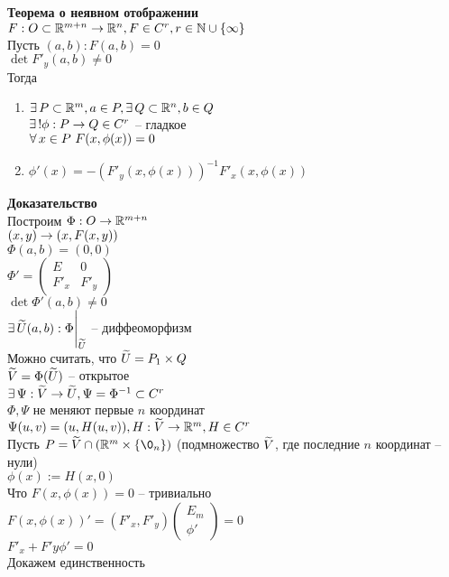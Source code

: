 \documentclass[12pt]{article}
\begin{document}
\textbf{Теорема о неявном отображении}\\
$F: O \subset \mathbb{R}^{m+n} \rightarrow \mathbb{R}^n, F \in C^r, r \in \mathbb{N} \cup \{\infty\}$\\
Пусть $(a, b): F(a,b) = 0$\\
$\det F'_y(a,b)\neq 0$\\
Тогда 
\begin{enumerate}
    \item $\exists\, P \subset \mathbb{R}^m, a \in P, \exists\, Q \subset \mathbb{R}^n, b \in Q$\\
    $\exists\,! \phi: P \rightarrow Q \in C^r$ -- гладкое\\
    $\forall\, x \in P\ F(x, \phi(x)) = 0$
    \item $\phi'(x) = -(F'_y(x,\phi(x)))^{-1}F'_x(x,\phi(x))$
\end{enumerate}
\textbf{Доказательство}\\
Построим $\Phi: O \rightarrow \mathbb{R}^{m+n}$\\
$(x,y) \rightarrow (x, F(x, y))$\\
$\Phi(a,b) = (0,0)$\\
$\Phi' = \begin{pmatrix}
    E & 0\\
    F'_x & F'_y
\end{pmatrix}$\\
$\det \Phi'(a,b) \neq 0$\\
$\exists\, \widetilde U(a,b): \Phi\Biggr|_{\widetilde U}$ -- диффеоморфизм\\
Можно считать, что $\widetilde U = P_1 \times Q$\\
$\widetilde V = \Phi(\widetilde U)$ -- открытое\\
$\exists\, \Psi: \widetilde V \rightarrow \widetilde U, \Psi = \Phi^{-1}\subset C^r$\\
$\Phi, \Psi$ не меняют первые $n$ координат\\
$\Psi(u,v) = (u, H(u,v)), H: \widetilde V \rightarrow \mathbb{R}^m, H \in C^r$\\
Пусть $P = \ot V \cap (\Rset^m \times \{\0_n\})$ (подмножество $\widetilde V$, где последние $n$ координат -- нули)\\
$\phi(x):= H(x,0)$\\
Что $F(x, \phi(x)) = 0$ -- тривиально\\
$F(x, \phi(x))' = (F'_x, F'_y) \begin{pmatrix}
    E_m\\\phi'
\end{pmatrix} = 0$\\
$F'_x + F'y\phi' = 0$\\
Докажем единственность\\
\end{document}

